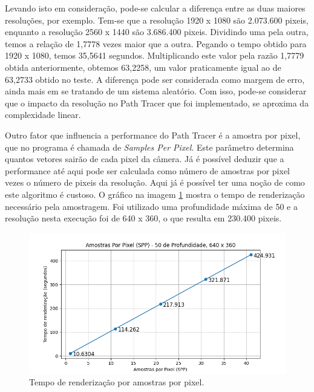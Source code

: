 \documentclass[journal]{IEEEtran}
\begin{document}
Levando isto em consideração, pode-se calcular a diferença entre as duas maiores resoluções, por exemplo.
Tem-se que a resolução 1920 x 1080 são 2.073.600 pixeis, enquanto a resolução 2560 x 1440 são 3.686.400
pixeis. Dividindo uma pela outra, temos a relação de 1,7778 vezes maior que a outra. Pegando o tempo
obtido para 1920 x 1080, temos 35,5641 segundos. Multiplicando este valor pela razão 1,7779 obtida 
anteriormente, obtemos 63,2258, um valor praticamente igual ao de 63,2733 obtido no teste. A diferença pode
ser considerada como margem de erro, ainda mais em se tratando de um sistema aleatório. Com isso, pode-se
considerar que o impacto da resolução no Path Tracer que foi implementado, se aproxima da complexidade
linear.

Outro fator que influencia a performance do Path Tracer é a amostra por pixel, que no programa é chamada
de \emph{Samples Per Pixel}. Este parâmetro determina quantos vetores sairão de cada pixel da câmera. Já é
possível deduzir que a performance até aqui pode ser calculada como número de amostras por pixel vezes o
número de pixeis da resolução. Aqui já é possível ter uma noção de como este algoritmo é custoso. O gráfico na imagem 
\ref{img_desktop_spp} mostra o tempo de renderização necessário pela amostragem. Foi utilizado uma profundidade
máxima de 50 e a resolução nesta execução foi de 640 x 360, o que resulta em 230.400 pixeis.

\begin{figure}[ht]
  \centering
  \includegraphics[width=\linewidth]{media/Desktop_SPP.png}
  \caption{Tempo de renderização por amostras por pixel.}
  \label{img_desktop_spp}
\end{figure}
\end{document}
